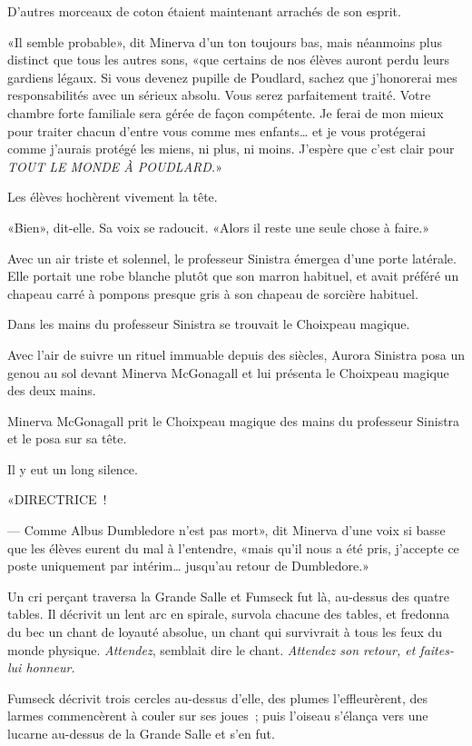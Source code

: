D'autres morceaux de coton étaient maintenant arrachés de son esprit.

«Il semble probable», dit Minerva d'un ton toujours bas, mais néanmoins plus distinct que tous les autres sons, «que certains de nos élèves auront perdu leurs gardiens légaux. Si vous devenez pupille de Poudlard, sachez que j'honorerai mes responsabilités avec un sérieux absolu. Vous serez parfaitement traité. Votre chambre forte familiale sera gérée de façon compétente. Je ferai de mon mieux pour traiter chacun d'entre vous comme mes enfants… et je vous protégerai comme j'aurais protégé les miens, ni plus, ni moins. J'espère que c'est clair pour \emph{TOUT LE MONDE À POUDLARD.}»

Les élèves hochèrent vivement la tête.

«Bien», dit-elle. Sa voix se radoucit. «Alors il reste une seule chose à faire.»

Avec un air triste et solennel, le professeur Sinistra émergea d'une porte latérale. Elle portait une robe blanche plutôt que son marron habituel, et avait préféré un chapeau carré à pompons presque gris à son chapeau de sorcière habituel.

Dans les mains du professeur Sinistra se trouvait le Choixpeau magique.

Avec l'air de suivre un rituel immuable depuis des siècles, Aurora Sinistra posa un genou au sol devant Minerva McGonagall et lui présenta le Choixpeau magique des deux mains.

Minerva McGonagall prit le Choixpeau magique des mains du professeur Sinistra et le posa sur sa tête.

Il y eut un long silence.

«DIRECTRICE~!

--- Comme Albus Dumbledore n'est pas mort», dit Minerva d'une voix si basse que les élèves eurent du mal à l'entendre, «mais qu'il nous a été pris, j'accepte ce poste uniquement par intérim… jusqu'au retour de Dumbledore.»

Un cri perçant traversa la Grande Salle et Fumseck fut là, au-dessus des quatre tables. Il décrivit un lent arc en spirale, survola chacune des tables, et fredonna du bec un chant de loyauté absolue, un chant qui survivrait à tous les feux du monde physique. \emph{Attendez}, semblait dire le chant. \emph{Attendez son retour, et faites-lui honneur.}

Fumseck décrivit trois cercles au-dessus d'elle, des plumes l'effleurèrent, des larmes commencèrent à couler sur ses joues~; puis l'oiseau s'élança vers une lucarne au-dessus de la Grande Salle et s'en fut.

